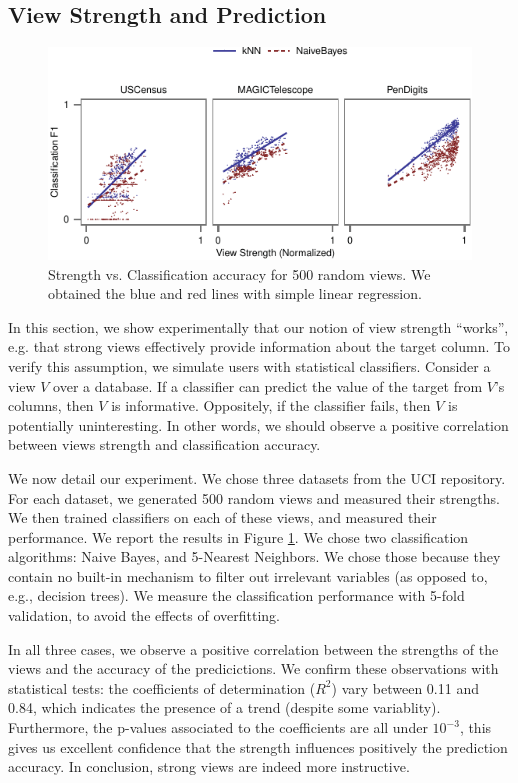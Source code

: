 \subsection{View Strength and Prediction}
\label{sec:view-strengh}
\begin{figure}[t!]
\centering
\includegraphics[width=\columnwidth]{plots/compare-strength-f1}
\caption{Strength vs. Classification accuracy for 500 random views. We obtained
    the blue and red lines with simple linear regression.}
\label{pic:strength-vs-f1}
\end{figure}
In this section, we show experimentally that our notion of view strength
``works'', e.g. that strong views effectively provide information about the
target column. To verify this assumption, we simulate users with statistical
classifiers. Consider a view $V$ over a database. If a classifier can predict
the value of the target from $V$'s columns, then $V$ is informative.
Oppositely, if the classifier fails, then $V$ is potentially uninteresting. In
other words, we should observe a positive correlation between views strength
and classification accuracy.

We now detail our experiment. We chose three datasets from the UCI repository.
For each dataset, we generated 500 random views and measured their strengths.
We then trained classifiers on each of these views, and measured their
performance. We report the results in Figure \ref{pic:strength-vs-f1}. We chose
two classification algorithms: Naive Bayes, and 5-Nearest Neighbors.  We chose
those because they contain no built-in mechanism to filter out irrelevant
variables (as opposed to, e.g., decision trees). We measure the classification
performance with 5-fold validation, to avoid the effects of overfitting.

In all three cases, we observe a positive correlation between the strengths of
the views and the accuracy of the predicictions. We confirm these observations
with statistical tests: the coefficients of determination ($R^2$) vary between
0.11 and 0.84, which indicates the presence of a trend (despite some
variablity). Furthermore, the p-values associated to the coefficients are all
under $10^{-3}$, this gives us excellent confidence that the strength
influences positively the prediction accuracy. In conclusion, strong views are
indeed more instructive.


